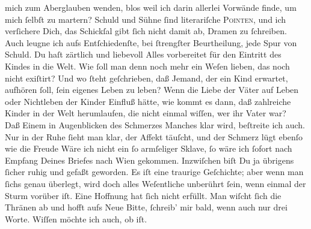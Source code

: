 \begin{ledgroupsized}[t]{13cm}
               mich zum Aber{\pb}glauben wenden, blos weil ich darin
               allerlei Vorwände finde\strikeout{\textcolor{gray}{n}}, um mich ſelbſt zu martern? Schuld und Sühne ſind literariſche \textsc{Pointen}, und
               ich verſichere Dich, das Schickſal gibt ſich nicht damit ab, Dramen zu ſchreiben.\pend
           \pstart
           Auch leugne ich aufs Entſchiedenſte, bei ſtrengſter Beurtheilung, jede Spur von
               Schuld. Du haſt zärtlich und liebevoll Alles vorbereitet für den Eintritt des Kindes in die Welt. Wie ſoll
               man denn noch mehr ein Weſen lieben, das noch nicht exiſtirt? Und wo ſteht
               geſchrieben, daß Jemand, der ein Kind erwartet, aufhören {\pb}ſoll, ſein eigenes Leben zu leben? Wenn die Liebe
               der Väter auf Leben oder Nichtleben der Kinder Einfluß hätte, wie kommt es dann, daß
               zahlreiche Kinder in der Welt herumlaufen, die nicht einmal wiſſen, wer ihr Vater
                  war? {\dotsfive}\pend
           \pstart
           Daß Einem in Augenblicken des Schmerzes Manches klar wird, beſtreite ich auch. Nur in
               der Ruhe ſieht man klar, der Affekt täuſcht, und der Schmerz lügt ebenſo wie die
                  Freude{\dotsfour}\pend
           \pstart
           Wäre ich nicht ein ſo armſeliger Sklave, ſo wäre ich ſofort nach Empfang Deines
               Briefes {\pb}nach Wien gekommen. Inzwiſchen biſt Du ja übrigens ſicher ruhig und gefaßt
               geworden. Es iſt eine traurige Geſchichte; aber wenn man ſichs genau überlegt, wird
               doch alles Weſentliche unberührt ſein, wenn einmal der Sturm vorüber iſt. Eine
               Hoffnung hat ſich nicht erfüllt. Man wiſcht ſich die Thränen ab und hofft aufs Neue{\dotsfour}\pend
           \pstart
           Bitte, ſchreib’ mir bald, wenn auch nur drei Worte. Wiſſen möchte ich auch, ob
                  \label{K_L02827-2v}\label{K_L02827-2h} iſt.\pend

\end{ledgroupsized}
